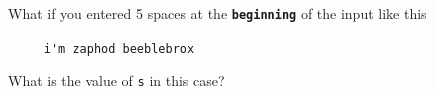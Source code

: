 What if you entered 5 spaces at the \textbf{\texttt{beginning}} of the input like this



\begin{center}

\verb!     i'm zaphod beeblebrox!

\end{center}



What is the value of \texttt{s} in this case?



